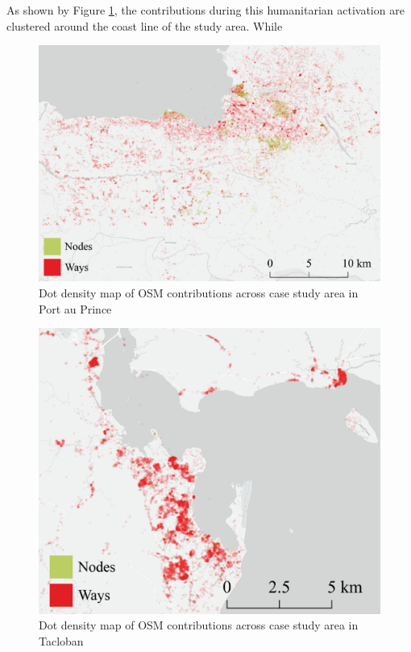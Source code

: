 As shown by Figure \ref{fig:pap}, the contributions during this humanitarian activation are clustered around the coast line of the study area. While 

\begin{figure}
    \centering 
    \includegraphics[width = \textwidth]{Images/pap_map.png}
    \caption[Port au Prince dot density map]{Dot density map of OSM contributions across case study area in Port au Prince} 
    \label{fig:pap} 
\end{figure}

\begin{figure}
    \centering 
    \includegraphics[width = \textwidth]{Images/tac_map.png}
    \caption[Tacloban dot density map]{Dot density map of OSM contributions across case study area in Tacloban} 
    \label{fig:tac} 
\end{figure}

